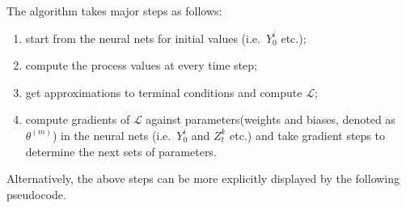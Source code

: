 \documentclass[a4paper,10pt]{article}
\newcommand{\1}{\mathbf{1}}
\begin{document}
The algorithm takes major steps as follows:

\renewcommand{\labelenumi}{\duck{enumi}}
\renewcommand{\labelenumii}{\duck{enumi}.\duckegg{enumii}}
\renewcommand{\labelenumiii}{\duck{enumi}.\duckegg{enumii}.\duckegg{enumiii}}
\renewcommand{\labelenumiv}{\duck{enumi}.\duckegg{enumii}.\duckegg{enumiii}.\duckchick{enumiv}} 


\begin{enumerate}
\tightlist
\item
  start from the neural nets for initial values (i.e.~\(Y_0^i\) etc.);
\item
  compute the process values at every time step;
\item
  get approximations to terminal conditions and compute \(\mathcal{L}\);
\item
  compute gradients of \(\mathcal{L}\) against parameters(weights and
  biases, denoted as \(\theta^{(m)}\)) in the neural nets
  (i.e.~\(Y_0^i\) and \(Z_t^k\) etc.) and take gradient steps to
  determine the next sets of parameters.
\end{enumerate}

Alternatively, the above steps can be more explicitly displayed by the following pseudocode.
\end{document}
